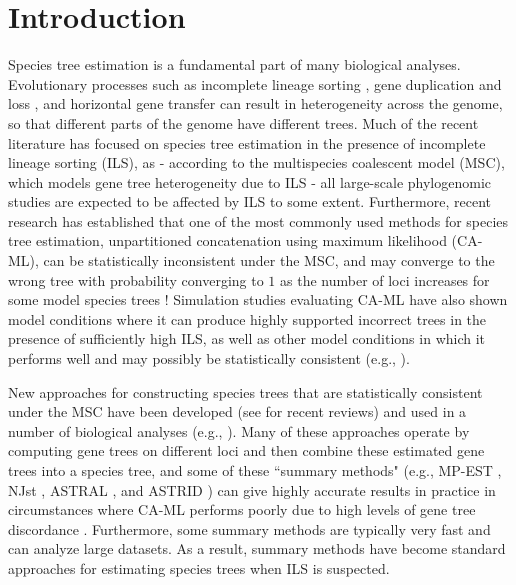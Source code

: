 
\section{Introduction}
   

Species tree estimation is a fundamental part of many biological
analyses. Evolutionary processes such as incomplete lineage sorting
\cite{maddison1997gene}, 
gene duplication and loss
\cite{ohno},
and horizontal gene transfer
\cite{woese2002evolution}
can result in heterogeneity across the genome, so that different parts
of the genome have different trees.  
Much of the recent literature has focused on species tree estimation in the presence of incomplete lineage sorting (ILS),
as - according to the multispecies coalescent model (MSC), which models gene tree heterogeneity due to ILS  -  all large-scale phylogenomic studies are expected to be affected by ILS to some extent.
Furthermore, recent research has
established that one of the most commonly used methods for species
tree estimation, unpartitioned concatenation using maximum likelihood
(CA-ML), can be statistically inconsistent under the MSC, and 
may converge to the wrong
 tree with probability converging to $1$ as the number of loci increases for some model species trees \cite{roch2015likelihood}!
Simulation studies evaluating  CA-ML have  also shown model conditions where it
can produce highly supported incorrect trees 
in the presence of sufficiently high ILS, as well as other model conditions in which
it performs well and may possibly be statistically consistent  (e.g., \cite{KubatkoDegnan2007,DeGiorgio2010}).



New approaches for constructing species trees that are statistically
consistent under the MSC have been developed
(see  \cite{mallo-posada-2016,allman2017split} for recent reviews)
and used in a number of biological
analyses (e.g., \cite{Song2012,jarvis2014whole,
  wickett2014phylotranscriptomic,Mitchell01012017,hosner2016rapid}).  
Many of these approaches
operate by computing gene trees on different loci and then combine
these estimated gene trees into a species tree, and some of these
``summary methods" (e.g., MP-EST \cite{Liu2010a},  NJst \cite{liu2011estimating}, ASTRAL \cite{astral,mirarab2015astral,astral3}, and ASTRID  \cite{vachaspati2015astrid}) can give highly accurate results in practice in
circumstances where CA-ML performs poorly due to high levels of gene
tree discordance
\cite{Liu2010a,mirarab2014evaluating,vachaspati2015astrid}.  
Furthermore, some summary
methods are typically very fast and can analyze large datasets.
As a result, summary methods have become standard approaches for estimating species trees when ILS is suspected.



